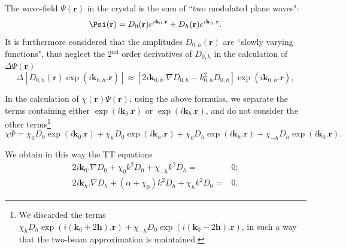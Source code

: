 \documentclass[preprint]{iucr}              %
\begin{document}
The wave-field $\Psi(\textbf{r})$ in the crystal is the sum of ``two modulated plane waves": 
\begin{equation}
\label{eq:wavefield}
    \Psi(\textbf r) = D_0(\textbf r) e^{i \textbf k_0 . \textbf r} + D_h(\textbf r) e^{i \textbf k_h . \textbf r}.
\end{equation}
It is furthermore considered that the amplitudes $D_{0,h}(\textbf{r})$ are ``slowly varying functions", thus neglect the 2$^{\text{nd}}$ order derivatives of $D_{0,h}$ in the calculation of $\Delta \Psi(\textbf{r})$
\begin{equation}
\Delta[D_{0,h}(\textbf{r}) \exp(i\textbf{k}_{0,h} . \textbf{r})] \approx 
 [2 i \textbf{k}_{0,h} . \nabla D_{0,h} - k^2_{0,h} D_{0,h}] \exp(i\textbf{k}_{0,h} . \textbf{r}), \nonumber
\end{equation}

In the calculation of $\chi(\textbf{r}) \Psi(\textbf{r})$, using the above formulas, we separate the terms containing either $\exp(i \textbf{k}_0 . \textbf{r})$ or $\exp(i \textbf{k}_h . \textbf{r})$, and do not consider the other terms\footnote{
We discarded the terms $\chi_h D_h \exp(i (\textbf{k}_0+2\textbf{h}) . \textbf{r}) + \chi_{-h} D_0 \exp(i (\textbf{k}_0 - 2 \textbf{h}) .\textbf{r})$,
in such a way that the two-beam approximation is maintained.}
\begin{equation}
\label{eq:approxchiPsi}
\chi\Psi =
\chi_0 D_0 \exp(i \textbf{k}_0 . \textbf{r}) +
\chi_h D_0 \exp(i \textbf{k}_h . \textbf{r}) +
\chi_0 D_h \exp(i \textbf{k}_h . \textbf{r}) +
\chi_{-h} D_h \exp(i \textbf{k}_0 . \textbf{r}). \nonumber
\end{equation}

We obtain in this way the TT equations 
\begin{subequations}
\label{eq:TTvectorAlpha}
\begin{align}
2 i \textbf{k}_0 . \nabla D_0 + \chi_0 k^2 D_0 + \chi_{-h} k^2 D_h =& 0; \\
2 i \textbf{k}_h . \nabla D_h + (\alpha + \chi_0) k^2 D_h + \chi_{h} k^2 D_0 =& 0.
\end{align}
\end{subequations}
\end{document}
